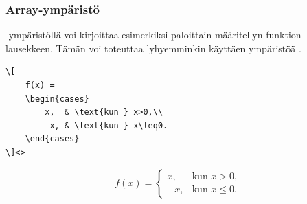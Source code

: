 \begin{frame}[fragile]
    \frametitle{Array-ympäristö}
    -ympäristöllä voi kirjoittaa esimerkiksi paloittain määritellyn funktion lausekkeen. Tämän voi toteuttaa lyhyemminkin käyttäen ympäristöä . 
    \begin{lstlisting}
\[
    f(x) =
    \begin{cases}
        x,  & \text{kun } x>0,\\
        -x, & \text{kun } x\leq0.
    \end{cases}
\]<>
    \end{lstlisting}
    \begin{sample}
        \[
            f(x) =
            \begin{cases}
                x,  & \text{kun } x>0,\\
                -x, & \text{kun } x\leq0.
            \end{cases}
        \]
    \end{sample}
\end{frame}

